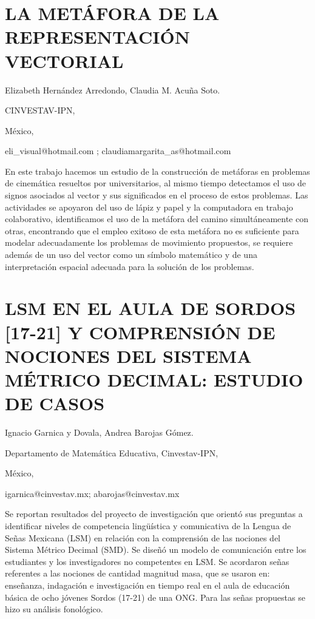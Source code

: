 \section{LA METÁFORA DE LA REPRESENTACIÓN VECTORIAL }

\begin{datos}

Elizabeth Hernández Arredondo, Claudia M. Acuña Soto.

CINVESTAV-IPN,

México,

eli\_visual@hotmail.com ; claudiamargarita\_as@hotmail.com

\end{datos}

En este trabajo hacemos un estudio de la construcción de metáforas
en problemas de cinemática resueltos por universitarios, al mismo
tiempo detectamos el uso de signos asociados al vector y sus significados
en el proceso de estos problemas. Las actividades se apoyaron del
uso de lápiz y papel y la computadora en trabajo colaborativo, identificamos
el uso de la metáfora del camino simultáneamente con otras, encontrando
que el empleo exitoso de esta metáfora no es suficiente para modelar
adecuadamente los problemas de movimiento propuestos, se requiere
además de un uso del vector como un símbolo matemático y de una interpretación
espacial adecuada para la solución de los problemas.


\section{LSM EN EL AULA DE SORDOS {[}17-21{]} Y COMPRENSIÓN DE NOCIONES DEL
SISTEMA MÉTRICO DECIMAL: ESTUDIO DE CASOS}

\begin{datos}

Ignacio Garnica y Dovala, Andrea Barojas Gómez.

Departamento de Matemática Educativa, Cinvestav-IPN,

México,

igarnica@cinvestav.mx; abarojas@cinvestav.mx 

\end{datos}

Se reportan resultados del proyecto de investigación que orientó sus
preguntas a identificar niveles de competencia lingüística y comunicativa
de la Lengua de Señas Mexicana (LSM) en relación con la comprensión
de las nociones del Sistema Métrico Decimal (SMD). Se diseñó un modelo
de comunicación entre los estudiantes y los investigadores no competentes
en LSM. Se acordaron señas referentes a las nociones de cantidad magnitud
masa, que se usaron en: enseñanza, indagación e investigación en tiempo
real en el aula de educación básica de ocho jóvenes Sordos (17-21)
de una ONG. Para las señas propuestas se hizo su análisis fonológico.

